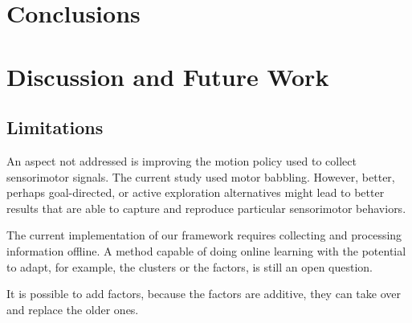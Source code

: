 \section{Conclusions}\label{sec:conclusion}


\section{Discussion and Future Work}

\subsection{Limitations}
An aspect not addressed is improving the motion policy used to collect sensorimotor signals. The current study used motor babbling. However, better, perhaps goal-directed, or active exploration alternatives might lead to better results that are able to capture and reproduce particular sensorimotor behaviors.

The current implementation of our framework requires collecting and processing information offline. A method capable of doing online learning with the potential to adapt, for example, the clusters or the factors, is still an open question.

It is possible to add factors, because the factors are additive, they can take over and replace the older ones.

\printbibliography 
